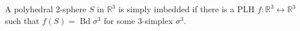 A polyhedral 2-sphere $S$ in $\mathbb{R}^3$ is simply imbedded if there is a PLH $f: \mathbb{R}^3 \leftrightarrow \mathbb{R}^3$ such that $f(S) = \operatorname{Bd} \sigma^3$ for some 3-simplex $\sigma^3$.
